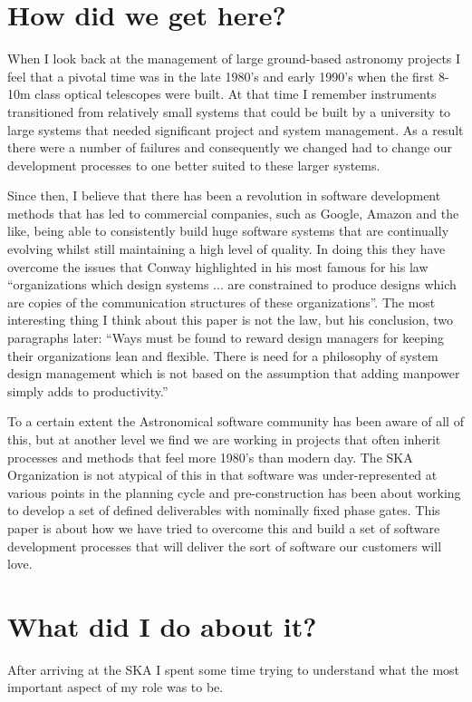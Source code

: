 \documentclass[11pt,twoside]{article}
\begin{document}
\section{How did we get here?}
When I look back at the management of large ground-based astronomy projects I feel that a pivotal time was in the late 1980's and early 1990's when the first 8-10m class optical telescopes were built. At that time I remember instruments transitioned from relatively small systems that could be built by a university to large systems that needed significant project and system management. As a result there were a number of failures and consequently we changed had to change our development processes to one better suited to these larger systems.

Since then, I believe that there has been a revolution in software development methods that has led to commercial companies, such as Google, Amazon and the like, being able to consistently build huge software systems that are continually evolving whilst still maintaining a high level of quality. In doing this they have overcome the issues that Conway highlighted in his most famous for his law ``organizations which design systems ... are constrained to produce designs which are copies of the communication structures of these organizations''. The most interesting thing I think about this paper is not the law, but his conclusion, two paragraphs later: ``Ways must be found to reward design managers for keeping their organizations lean and flexible. There is need for a philosophy of system design management which is not based on the assumption that adding manpower simply adds to productivity.''

To a certain extent the Astronomical software community has been aware of all of this, but at another level we find we are working in projects that often inherit processes and methods that feel more 1980's than modern day. The SKA Organization is not atypical of this in that software was under-represented at various points in the planning cycle and pre-construction has been about working to develop a set of defined deliverables with nominally fixed phase gates. This paper is about how we have tried to overcome this and build a set of software development processes that will deliver the sort of software our customers will love.

\section{What did I do about it?}
After arriving at the SKA I spent some time trying to understand what the most important aspect of my role was to be. 
\end{document}

